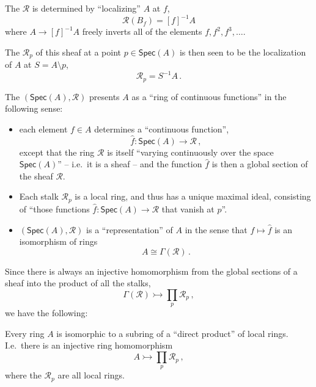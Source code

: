 \documentclass[lambek.tex]{subfiles}
\begin{document}
The  $\mathcal {R}$ is determined by ``localizing'' $A$ at $f$,
\[
\mathcal{R}(B_f) = [f]^{-1}A
\]
where $A \rightarrow [f]^{-1}A$ freely inverts all of the elements $f, f^2, f^3, \dots$.
\medskip

The  $\mathcal {R}_p$ of this sheaf at a point $p\in\mathsf{Spec}(A)$ is then seen to be the localization of $A$ at $S = A\setminus p$,
\[
\mathcal{R}_p = S^{-1}A\,.
\]


The  $(\mathsf{Spec}(A), \mathcal {R})$ presents $A$ as a ``ring of continuous functions'' in the following sense: 
\begin{itemize}
\item each element $f\in A$ determines a ``continuous function'',
\[
\hat{f} : \mathsf{Spec}(A) \to \mathcal {R}\,,
\]
except that the ring $\mathcal{R}$ is itself ``varying continuously over the space $\mathsf{Spec}(A)$'' -- i.e.\ it is a sheaf -- and the function $\hat{f}$ is then a global section of the sheaf $\mathcal{R}$.  

\item Each stalk $\mathcal{R}_p$ is a local ring, and thus has a  unique maximal ideal, consisting of ``those functions  $\hat{f} : \mathsf{Spec}(A) \to \mathcal{R}$ that vanish at $p$''.

\item $(\mathsf{Spec}(A), \mathcal {R})$ is a ``representation'' of $A$ in the sense that $f\mapsto\hat{f}$ is an isomorphism of rings
\[
A \cong \Gamma(\mathcal{R})\,.
\]
\end{itemize}

Since there is always an injective homomorphism from the global sections of a sheaf into the product of all the stalks,
\[
\Gamma(\mathcal{R}) \rightarrowtail \prod_{p}\mathcal{R}_p \,,
\]
we have the following:

\begin{corollary}
Every ring $A$ is isomorphic to a {sub}ring of a ``direct product'' of local rings.
I.e.\ there is an injective ring homomorphism
\[
A \rightarrowtail \prod_{p}\mathcal{R}_p \,,
\]
where the $\mathcal{R}_p$ are all local rings.
\end{corollary}
\end{document}
